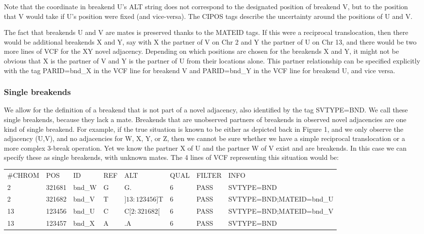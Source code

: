 \documentclass[8pt]{article}
\begin{document}
Note that the coordinate in breakend U's ALT string does not correspond to the designated position of breakend V, but to the position that V would take if U's position were fixed (and vice-versa).
The CIPOS tags describe the uncertainty around the positions of U and V.

The fact that breakends U and V are mates is preserved thanks to the MATEID tags.
If this were a reciprocal translocation, then there would be additional breakends X and Y, say with X the partner of V on Chr 2 and Y the partner of U on Chr 13, and there would be two more lines of VCF for the XY novel adjacency.
Depending on which positions are chosen for the breakends X and Y, it might not be obvious that X is the partner of V and Y is the partner of U from their locations alone.
This partner relationship can be specified explicitly with the tag PARID=bnd\_X in the VCF line for breakend V and PARID=bnd\_Y in the VCF line for breakend U, and vice versa.

\subsubsection{Single breakends}
We allow for the definition of a breakend that is not part of a novel adjacency, also identified by the tag SVTYPE=BND.
We call these single breakends, because they lack a mate.
Breakends that are unobserved partners of breakends in observed novel adjacencies are one kind of single breakend.
For example, if the true situation is known to be either as depicted back in Figure 1, and we only observe the adjacency (U,V), and no adjacencies for W, X, Y, or Z, then we cannot be sure whether we have a simple reciprocal translocation or a more complex 3-break operation.
Yet we know the partner X of U and the partner W of V exist and are breakends. In this case we can specify these as single breakends, with unknown mates.
The 4 lines of VCF representing this situation would be:

\vspace{0.3cm}
\small
\begin{tabular}{ l l l l l l l l }
\#CHROM & POS & ID & REF & ALT & QUAL & FILTER & INFO \\
2 & 321681 & bnd\_W & G & G. & 6 & PASS & SVTYPE=BND \\
2 & 321682 & bnd\_V & T & $]13:123456]$T & 6 & PASS & SVTYPE=BND;MATEID=bnd\_U \\
13 & 123456 & bnd\_U & C & C$[2:321682[$ & 6 & PASS & SVTYPE=BND;MATEID=bnd\_V \\
13 & 123457 & bnd\_X & A & .A & 6 & PASS & SVTYPE=BND \\
\end{tabular}
\normalsize
\vspace{0.3cm}
\end{document}
